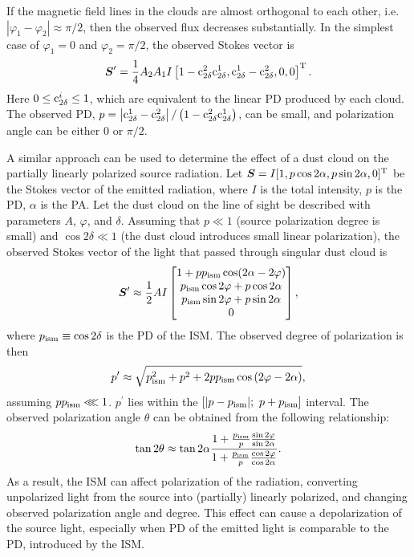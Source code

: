If the magnetic field lines in the clouds are almost orthogonal to each other, i.e. $\left|\varphi_1 - \varphi_2\right| \approx \pi/2$, then the observed flux decreases substantially.
In the simplest case of $\varphi_1 = 0$ and $\varphi_2 = \pi/ 2$, the observed Stokes vector is 
\begin{equation}
\boldsymbol{S}^\prime = \frac{1}{4}A_2A_1I \left[1 - \mathrm{c}^{2}_{2\delta}\mathrm{c}^{1}_{2\delta}, \mathrm{c}^{1}_{2\delta} - \mathrm{c}^{2}_{2\delta}, 0, 0\right]^{\mathrm{T}}.
\end{equation}
Here $0 \le \mathrm{c}^{i}_{2\delta} \le 1$, which are equivalent to the linear \gls{PD} produced by each cloud.
The observed \gls{PD}, $p = \left|\mathrm{c}^{1}_{2\delta} - \mathrm{c}^{2}_{2\delta}\right|/\left(1 - \mathrm{c}^{2}_{2\delta}\mathrm{c}^{1}_{2\delta}\right)$, can be small, and polarization angle can be either $0$ or $\pi / 2$.

A similar approach can be used to determine the effect of a dust cloud on the partially linearly polarized source radiation.
Let $\boldsymbol{S} = I[1, p\cos2\alpha, p\sin2\alpha, 0]^{\mathrm{T}}$ be the Stokes vector of the emitted radiation, where $I$ is the total intensity, $p$ is the \gls{PD}, $\alpha$ is the \gls{PA}.
Let the dust cloud on the line of sight be described with parameters $A$, $\varphi$, and $\delta$.
Assuming that $p \ll 1$ (source polarization degree is small) and $\cos2\delta \ll 1$ (the dust cloud introduces small linear polarization), the observed Stokes vector of the light that passed through singular dust cloud is
\begin{equation}
    \label{eq:pol_small_p_approx}
    \boldsymbol{S}^\prime \approx \frac{1}{2} A I 
    \begin{bmatrix}
        1 + p p_{\mathrm{ism}}\cos(2\alpha - 2\varphi) \\
        p_{\mathrm{ism}}\cos2\varphi + p\cos2\alpha \\
        p_{\mathrm{ism}}\sin2\varphi + p\sin2\alpha \\
        0
    \end{bmatrix},
\end{equation}
where $p_{\mathrm{ism}} \equiv \cos2\delta$ is the \gls{PD} of the \gls{ISM}.
The observed degree of polarization is then 
\begin{equation}
    p^\prime \approx \sqrt{p_{\mathrm{ism}}^2 + p ^ 2 + 2pp_{\mathrm{ism}}\cos\left(2\varphi - 2\alpha\right)},
\end{equation}
assuming $pp_{\mathrm{ism}} \lll 1$.
$p^\prime$ lies within the $[|p - p_{\mathrm{ism}}|;~p + p_{\mathrm{ism}}]$ interval.
The observed polarization angle $\theta$ can be obtained from the following relationship:
\begin{equation}
    \tan 2\theta \approx \tan 2\alpha \frac{1 + \frac{p_{\mathrm{ism}}}{p} \frac{\sin2\varphi}{\sin 2\alpha}}{1 + \frac{p_{\mathrm{ism}}}{p}\frac{\cos2\varphi}{\cos2\alpha}}.
\end{equation}
As a result, the \gls{ISM} can affect polarization of the radiation, converting unpolarized light from the source into (partially) linearly polarized, and changing observed polarization angle and degree.
This effect can cause a depolarization of the source light, especially when \gls{PD} of the emitted light is comparable to the \gls{PD}, introduced by the \gls{ISM}.

